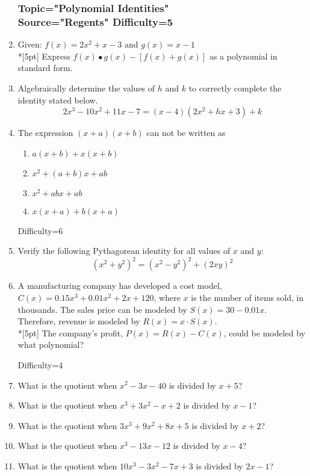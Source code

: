 \documentclass[12pt, oneside]{article}
\begin{document}
\begin{enumerate}
\subsubsection*{Topic="Polynomial Identities"\\
Source="Regents" 
Difficulty=5}

\item Given: $f(x)=2x^2+ x - 3$ and $g(x)=x-1$\\*[5pt]
Express $f(x) \bullet g(x) - [f(x) + g(x)]$ as a polynomial in standard form. %

\item Algebraically determine the values of $h$ and $k$ to correctly complete the identity stated below.
\[2x^3-10x^2+11x-7=(x-4)(2x^2+hx+3)+k\] %

\item The expression $(x + a)(x + b)$ can not be written as
\begin{enumerate}
    \item $a(x + b)+ x(x + b)$
    \item $x^2 + (a + b)x + ab$ 
    \item  $x^2 + abx + ab$  
    \item $x(x + a)+ b(x + a)$
\end{enumerate}

Difficulty=6
\item Verify the following Pythagorean identity for all values of $x$ and $y$: \[(x^2 + y^2)^2= (x^2- y^2)^2+ (2xy)^2\] %

\item A manufacturing company has developed a cost model, $C(x)=0.15x^3+0.01x^2+2x+120$, where $x$ is the number of items sold, in thousands. The sales price can be modeled by $S(x)=30-0.01x$. Therefore, revenue is modeled by $R(x)=x \cdot S(x)$.\\*[5pt]
The company’s profit, $P(x)=R(x)-C(x)$, could be modeled by what polynomial?  %

Difficulty=4
\item What is the quotient when $x^2-3x-40$ is divided by $x + 5$?
\item What is the quotient when $x^3+3x^2-x+2$ is divided by $x - 1$?
\item What is the quotient when $3x^3+9x^2+8x+5$ is divided by $x+2$?
\item What is the quotient when $x^3-13x-12$ is divided by $x - 4$?
\item What is the quotient when $10x^3-3x^2-7x+3$ is divided by $2x - 1$? %


\end{enumerate}
\end{document}
